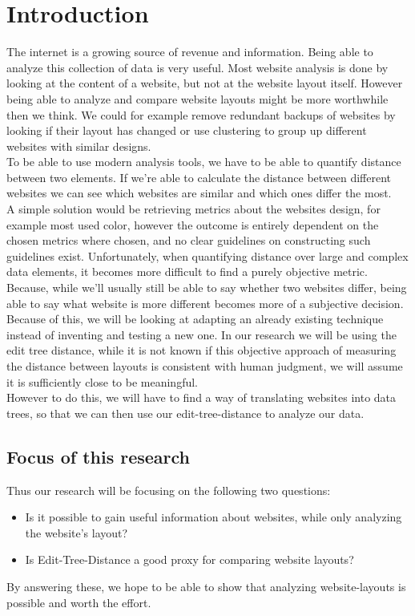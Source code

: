 \chapter{Introduction}\label{introduction}
The internet is a growing source of revenue and information. Being able to analyze this collection of data is very useful. Most website analysis is done by looking at the content of a website, but not at the website layout itself. However being able to analyze and compare website layouts might be more worthwhile then we think. We could for example remove redundant backups of websites by looking if their layout has changed or use clustering to group up different websites with similar designs.
\\ To be able to use modern analysis tools, we have to be able to quantify distance between two elements. If we're able to calculate the distance between different websites we can see which websites are similar and which ones differ the most.
\\ A simple solution would be retrieving metrics about the websites design, for example most used color, however the outcome is entirely dependent on the chosen metrics where chosen, and no clear guidelines on constructing such guidelines exist. Unfortunately, when quantifying distance over large and complex data elements, it becomes more difficult to find a purely objective metric. Because, while we'll usually still be able to say whether two websites differ, being able to say what website is more different becomes more of a subjective decision.\\
Because of this, we will be looking at adapting an already existing technique instead of inventing and testing a new one. In our research we will be using the edit tree distance, while it is not known if this objective approach of measuring the distance between layouts is consistent with human judgment, we will assume it is sufficiently close to be meaningful.\\
However to do this, we will have to find a way of translating websites into data trees, so that we can then use our edit-tree-distance to analyze our data.\\
\section{Focus of this research}
Thus our research will be focusing on the following two questions:
\begin{itemize}
\item Is it possible to gain useful information about websites, while only analyzing the website's layout?
\item Is Edit-Tree-Distance a good proxy for comparing website layouts?
\end{itemize}
By answering these, we hope to be able to show that analyzing website-layouts is possible and worth the effort.